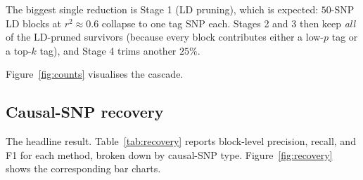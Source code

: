 \documentclass[11pt,a4paper]{article}
\begin{document}
The biggest single reduction is Stage 1 (LD pruning), which is
expected: $50$-SNP LD blocks at $r^2 \approx 0.6$ collapse to one
tag SNP each. Stages 2 and 3 then keep \emph{all} of the LD-pruned
survivors (because every block contributes either a low-$p$ tag or a
top-$k$ tag), and Stage 4 trims another $25\%$.

Figure~\ref{fig:counts} visualises the cascade.

\subsection{Causal-SNP recovery}

The headline result. Table~\ref{tab:recovery} reports block-level
precision, recall, and F1 for each method, broken down by causal-SNP
type. Figure~\ref{fig:recovery} shows the corresponding bar charts.
\end{document}
